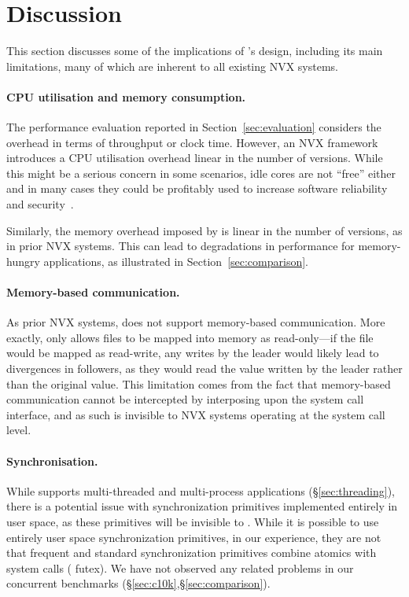 \section{Discussion}
\label{sec:discussion}

This section discusses some of the implications of \varan's design,
including its main limitations, many of which are inherent to all
existing NVX systems.

\paragraph{CPU utilisation and memory consumption.} The performance
evaluation reported in Section~\ref{sec:evaluation} considers the
overhead in terms of throughput or clock time.  However, an NVX
framework introduces a CPU utilisation overhead linear in the number
of versions.  While this might be a serious concern in some scenarios,
idle cores are not ``free'' either~\cite{barroso2007} and in many
cases they could be profitably used to increase software reliability
and security~\cite{cox2006,multiplicity,orchestra09,diehard06}.


Similarly, the memory overhead imposed by \varan is linear in the
number of versions, as in prior NVX systems.  This can lead to
degradations in performance for memory-hungry applications, as
illustrated in Section~\ref{sec:comparison}.


\paragraph{Memory-based communication.} As prior NVX
systems, %
\varan does not support memory-based communication.  More exactly,
\varan only allows files to be mapped into memory as read-only---if
the file would be mapped as read-write, any writes by the leader would
likely lead to divergences in followers, as they would read the value
written by the leader rather than the original value.  This limitation
comes from the fact that memory-based communication cannot be
intercepted by interposing upon the system call interface, and as such
is invisible to NVX systems operating at the system call level.


\paragraph{Synchronisation.} While \varan supports multi-threaded and
multi-process applications (\S\ref{sec:threading}), there is a
potential issue with synchronization primitives implemented entirely
in user space, as these primitives will be invisible to \varan. While
it is possible to use entirely user space synchronization primitives,
in our experience, they are not that frequent and standard
synchronization primitives combine atomics with system calls (\ie
futex). We have not observed any related problems in our concurrent
benchmarks (\S\ref{sec:c10k},\S\ref{sec:comparison}).

